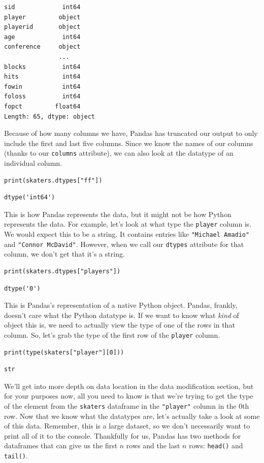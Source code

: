 \begin{lstlisting}[style=none]
sid             int64
player         object
playerid       object
age             int64
conference     object
               ...
blocks          int64
hits            int64
fowin           int64
foloss          int64
fopct         float64
Length: 65, dtype: object
\end{lstlisting}
Because of how many columns we have, Pandas has truncated our output to only include the first and last five columns. Since we know the names of our columns (thanks to our \verb|columns| attribute), we can also look at the datatype of an individual column.\par
\begin{lstlisting}[style=pippython]
print(skaters.dtypes["ff"])
\end{lstlisting}
\begin{lstlisting}[style=none]
dtype('int64')
\end{lstlisting}
This is how Pandas represents the data, but it might not be how Python represents the data. For example, let's look at what type the \verb|player| column is. We would expect this to be a string. It contains entries like \verb|"Michael Amadio"| and \verb|"Connor McDavid"|. However, when we call our \verb|dtypes| attribute for that column, we don't get that it's a string.\par
\begin{lstlisting}[style=pippython]
print(skaters.dtypes["players"])
\end{lstlisting}
\begin{lstlisting}[style=none]
dtype('0')
\end{lstlisting}
This is Pandas's representation of a native Python object. Pandas, frankly, doesn't care what the Python datatype is. If we want to know what \textit{kind} of object this is, we need to actually view the type of one of the rows in that column. So, let's grab the type of the first row of the \verb|player| column.
\begin{lstlisting}[style=pippython]
print(type(skaters["player"][0]))
\end{lstlisting}
\begin{lstlisting}[style=none]
str
\end{lstlisting}
We'll get into more depth on data location in the data modification section, but for your purposes now, all you need to know is that we're trying to get the type of the element from the \verb|skaters| dataframe in the \verb|"player"| column in the 0th row.
Now that we know what the datatypes are, let's actually take a look at some of this data. Remember, this is a large dataset, so we don't necessarily want to print all of it to the console. Thankfully for us, Pandas has two methods for dataframes that can give us the first $n$ rows and the last $n$ rows: \verb|head()| and \verb|tail()|.\par
